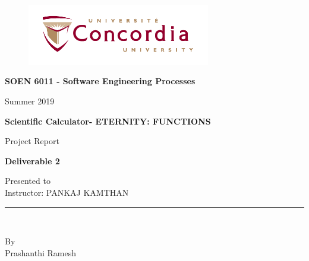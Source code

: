 \documentclass[11pt, english]{report}
\begin{document}
\begin{titlepage}

\begin{center}
\vspace*{-1in}
\begin{figure}[htb]
\begin{center}
\includegraphics[width=8cm]{logo}
\end{center}
\end{figure}
\begin{Large}
\textbf{SOEN 6011 - Software Engineering Processes} \\
\end{Large}
\vspace*{0.1in}
Summer 2019\\
\vspace*{0.5in}
\begin{Large}
\textbf{Scientific Calculator-  ETERNITY: FUNCTIONS} \\
\end{Large}
\vspace*{0.4in}
\begin{large}
Project Report\\
\end{large}
\vspace*{0.2in}
\begin{Large}
\textbf{Deliverable 2} \\
\end{Large}
\vspace*{0.3in}
\begin{large}
Presented to \\
\vspace*{0.1in}
Instructor: PANKAJ KAMTHAN 
 \\
\end{large}
\vspace*{0.3in}
\rule{80mm}{0.1mm}\\
\vspace*{0.1in}
\begin{large}
By \\
Prashanthi Ramesh\\ 
\vspace*{0.3in}
\date{\normalsize\today} 

\end{large}
\end{center}
\end{titlepage}
\end{document}
